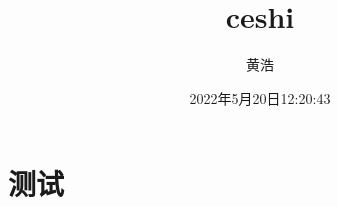 \documentclass[12pt]{ctexart}
\begin{document}
\title{ceshi}
\author{黄浩}
\date{2022年5月20日12:20:43}
\part{测试}
\end{document}

